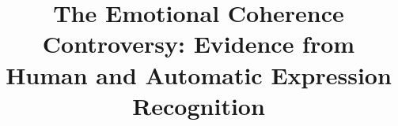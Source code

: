 \documentclass[conference,final,]{IEEEtran}
\begin{document}
%
\title{The Emotional Coherence Controversy: Evidence from Human and Automatic
Expression Recognition}


\author{




\IEEEauthorblockN{
}
\and
\IEEEauthorblockN{
}






}

\end{document}
